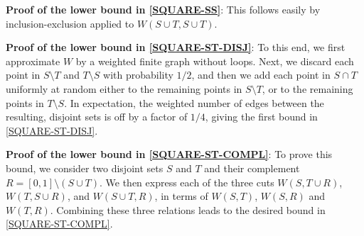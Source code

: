 \documentclass[12pt]{article}
\numberwithin{equation}{section}
\begin{document}
{\bf Proof of the lower bound in \eqref{SQUARE-SS}}:
This follows easily by
inclusion-exclusion applied to $W(S\cup T,S\cup T)$.


{\bf Proof of the lower bound in \eqref{SQUARE-ST-DISJ}}: To this
end, we first approximate $W$ by a weighted finite graph without
loops.  Next, we discard each point in $S\setminus T$ and $T\setminus
S$ with probability $1/2$, and then we add each point in $S\cap T$
uniformly at random either to the remaining points in $S\setminus T$,
or to the remaining points in $T\setminus S$.  In expectation, the
weighted number of edges  between the resulting, disjoint sets is off
by a factor of $1/4$, giving the first bound in
\eqref{SQUARE-ST-DISJ}.

{\bf Proof of the lower bound in \eqref{SQUARE-ST-COMPL}}:
To prove this bound, we consider two disjoint sets $S$ and $T$
and their complement $R=[0,1]\setminus(S\cup T)$.  We then express
each of the three cuts $W(S,T\cup R)$, $W(T,S\cup R)$, and $W(S\cup
T,R)$, in terms of $W(S,T)$, $W(S,R)$ and $W(T,R)$.  Combining these
three relations leads to the desired bound in
\eqref{SQUARE-ST-COMPL}.
\end{document}
